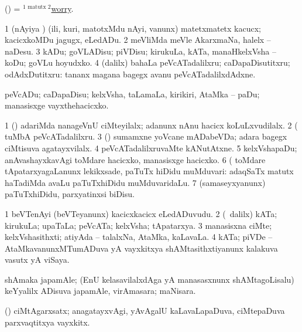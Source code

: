 \begin{center}
\bentry
{} 
\expl{}
\bmng
(\AmA) = \hyperlink{worry(1)}{$^{1\text{ matutx }2}$worry}. 
\emng
\eentry

\bentry 
{} 
\gl{\sakirx}
\expl{}
\bmng
\bnum
\num{1} (nAyiya \vi) (ili, kuri, matotxMdu nAyi, \mo vanunx) matetxmatetx kacucx; kacicxkoMDu jagugx, eLedADu. 
\num{2} meVliMda meVle AkarxmaNa, halelx -- naDesu. 
\num{3} kADu; goVLADisu; piVDisu; kirukuLa, kATa, manaHkelxVsha -- koDu; goVLu hoyudxko. 
\num{4} (\BUkaq dalilx) bahaLa peVcATadalilxru; caDapaDisutitxru; odAdxDutitxru:  tananx magana bagegx avanu peVcATadalilxdAdxne. 
\enum
\emng

\noindent
\gl{\akirx}
\expl{}
\bmng
peVcADu; caDapaDisu; kelxVsha, taLamaLa, kirikiri, AtaMka -- paDu; manasisxge vayxthehacicxko. 
\emng

\noindent
\gl{\pagu}
\expl{}
\bmng
\bnum
\num{1}  (\AmA) adariMda nanageVnU ciMteyilalx; adanunx nAnu hacicx koLuLxvudilalx. 
\num{2}  (  tuMbA peVcATadalilxru. 
\num{3}  (\AmA) sumamxne yoVcane mADabeVDa; adara bagegx ciMtisuva agatayxvilalx. 
\num{4}  peVcATadalilxruvaMte kANutAtxne. 
\num{5}  kelxVshapaDu; anAvashayxkavAgi toMdare hacicxko, manasisxge hacicxko. 
\num{6}  (  toMdare tApatarxyagaLanunx lekikxsade, paTuTx hiDidu muMduvari:  adaqSaTx matutx haTadiMda avaLu paTuTxhiDidu muMduvaridaLu. 
\num{7}  (samaseyxyanunx) paTuTxhiDidu, parxyatinxsi biDisu. 
\enum
\emng
\eentry

\bentry
{}
\gl{\nA}
\bmng
\bnum
\num{1} beVTenAyi (beVTeyanunx) kacicxkacicx eLedADuvudu. 
\num{2} (\sA\ \bava dalilx) kATa; kirukuLa; upaTaLa; peVcATa; kelxVsha; tApatarxya. 
\num{3} manasisxna ciMte; kelxVshasithxti; atiyAda -- talalxNa, AtaMka, kaLavaLa. 
\num{4} kATa; piVDe -- AtaMkavanunxMTumADuva yA vayxkitxya shAMtasithxtiyanunx kalakuva vasutx yA viSaya. 
\enum
\emng
\eentry

\bentry
{} 
\gl{\nA}
\expl{}
\bmng
shAmaka japamAle; (EnU kelasavilalxdAga yA manasasxnunx shAMtagoLisalu) keYyalilx ADisuva japamAle, virAmasara; maNisara. 
\emng
\eentry

\bentry
{} 
\gl{\nA}
\expl{}
\bmng
(\AmA) ciMtAgarxsatx; anagatayxvAgi, yAvAgalU kaLavaLapaDuva, ciMtepaDuva parxvaqtitxya vayxkitx. 
\emng
\eentry


\end{center}
